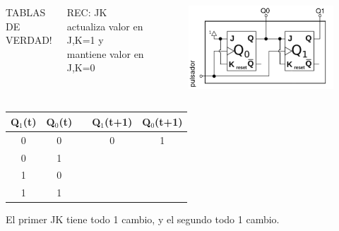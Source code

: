 \documentclass[10pt]{beamer}
\begin{document}
\begin{frame}
{\begin{columns}
\begin{mdframed}[backgroundcolor=frenchblue!20]
  TABLAS DE VERDAD!
\end{mdframed}
\vspace{0.15cm}
REC: JK actualiza valor en J,K=1 y mantiene valor en J,K=0
\begin{figure}[h!]
    \centering
    \includegraphics[scale=0.23]{circuito.png}
\end{figure}
\end{columns}
\begin{table}[h!]
\begin{tabular}{|c|c|c|c|c|}
\hline
Q$_1$(t) & Q$_0$(t) &  & Q$_1$(t+1) & Q$_0$(t+1) \\ \hline
0        & 0        &  & 0          & 1          \\ \hline
0        & 1        &  &           &           \\ \hline
1        & 0        &  &           &           \\ \hline
1        & 1        &  &           &           \\ \hline
\end{tabular}
\end{table}
El primer JK tiene todo 1 cambio, y el segundo todo 1 cambio.}
\end{frame}
\end{document}
